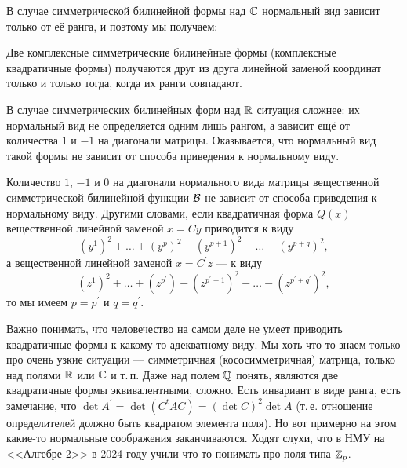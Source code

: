 В случае симметрической билинейной формы над $\mathbb{C}$ нормальный вид зависит только от её ранга, и поэтому мы получаем:

\begin{proposal}
    Две комплексные симметрические билинейные формы (комплексные квадратичные формы) получаются друг из друга линейной заменой координат только и только тогда, когда их ранги совпадают.
\end{proposal}

В случае симметрических билинейных форм над $\mathbb{R}$ ситуация сложнее: их нормальный вид не определяется одним лишь рангом, а зависит ещё от количества $1$ и $-1$ на диагонали матрицы. Оказывается, что нормальный вид такой формы не зависит от способа приведения к нормальному виду.

\begin{theorem}
    Количество $1$, $-1$ и $0$ на диагонали нормального вида матрицы вещественной симметрической билинейной функции $\mathcal{B}$ не зависит от способа приведения к нормальному виду.
    Другими словами, если квадратичная форма $Q(x)$ вещественной линейной заменой $x = Cy$ приводится к виду
    \[
        (y^1)^2 + \ldots + (y^p)^2 - (y^{p + 1})^2 - \ldots - (y^{p + q})^2,
    \]
    а вещественной линейной заменой $x = C^\prime z$ --- к виду
    \[
        (z^1)^2 + \ldots + (z^{p^\prime}) - (z^{p^\prime + 1})^2 - \ldots - (z^{p^\prime + q^\prime})^2,
    \]
    то мы имеем $p = p^\prime$ и $q = q^\prime$.
\end{theorem}

\begin{remark}
    Важно понимать, что человечество на самом деле не умеет приводить квадратичные формы к какому-то адекватному виду. Мы хоть что-то знаем только про очень узкие ситуации --- симметричная (кососимметричная) матрица, только над полями $\mathbb{R}$ или $\mathbb{C}$ и т.\,п. Даже над полем $\mathbb{Q}$ понять, являются две квадратичные формы эквивалентными, сложно. Есть инвариант в виде ранга, есть замечание, что $\det A^\prime = \det (C^tAC) = (\det C)^2\det A$ (т.\,е. отношение определителей должно быть квадратом элемента поля). Но вот примерно на этом какие-то нормальные соображения заканчиваются. Ходят слухи, что в НМУ на <<Алгебре 2>> в 2024 году учили что-то понимать про поля типа $\mathbb{Z}_p$.
\end{remark}


